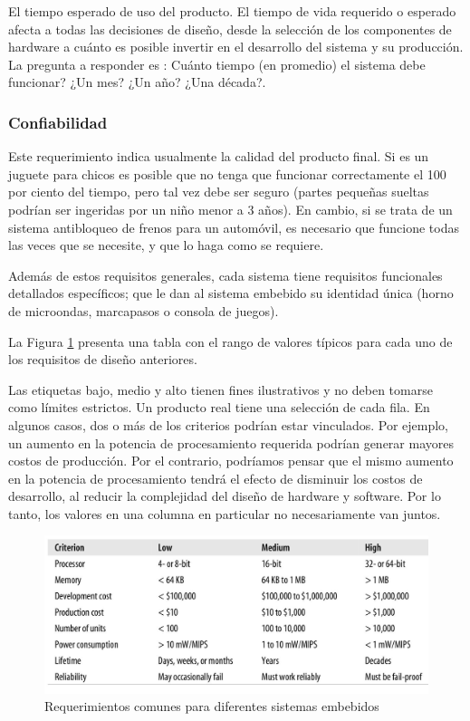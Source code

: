 \documentclass[output=paper, 
colorlinks,
citecolor=brown,
newtxmath
]{langscibook}
\begin{document}
El tiempo esperado de uso del producto. El tiempo de vida requerido o esperado
afecta a todas las decisiones de diseño, desde la selección de los componentes
de hardware a cuánto es posible invertir en el desarrollo del sistema y su 
producción. La pregunta a responder es : Cuánto tiempo (en promedio) el sistema
debe funcionar? ¿Un mes? ¿Un año? ¿Una década?.



\subsubsection {Confiabilidad}

Este requerimiento indica usualmente la calidad del producto final. 
Si es un juguete para chicos es posible que no tenga que funcionar correctamente el 100 por 
ciento del tiempo, pero tal vez debe ser seguro (partes pequeñas sueltas podrían ser ingeridas por 
un niño menor a 3 años). En cambio, si se trata de un sistema antibloqueo 
de frenos para un automóvil, es necesario que funcione todas las veces
que se necesite, y que lo haga como se requiere.

Además de estos requisitos generales, cada sistema tiene requisitos funcionales 
detallados específicos; que le dan al sistema embebido su identidad única (horno de microondas, marcapasos o consola de juegos).

La Figura \ref{fig:tabla-rango} presenta una tabla con el rango de valores típicos para cada uno de los requisitos de diseño anteriores. 

Las etiquetas bajo, medio y alto tienen fines ilustrativos y no deben tomarse como límites estrictos. 
Un producto real tiene una selección de cada fila. En algunos casos, dos o más de los criterios 
podrían estar vinculados. Por ejemplo, un aumento en la potencia de procesamiento 
requerida podrían generar mayores costos de producción. 
Por el contrario, podríamos pensar que el mismo aumento en la potencia de 
procesamiento tendrá el efecto de disminuir los costos de desarrollo, 
al reducir la complejidad del diseño de hardware y software. 
Por lo tanto, los valores en una columna en particular no necesariamente van juntos.


\begin{figure}
\includegraphics[scale=0.25]{images/requerimientos-comunes.jpg}
\caption{Requerimientos comunes para diferentes sistemas embebidos}
\label{fig:tabla-rango}
\end{figure}
\end{document}

